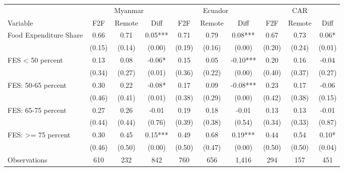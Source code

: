 \begin{tabular}{l*{9}c}
\hline\hline
 & \multicolumn{3}{c}{Myanmar} & \multicolumn{3}{c}{Ecuador} & \multicolumn{3}{c}{CAR}\\ 
Variable & F2F & Remote & Diff & F2F & Remote & Diff & F2F & Remote & Diff \\
\hline
Food Expenditure Share&0.66&0.71&0.05***&0.71&0.79&0.08***&0.67&0.73&0.06*\\
&(0.15)&(0.14)&(0.00)&(0.19)&(0.16)&(0.00)&(0.20)&(0.24)&(0.01)\\
FES < 50 percent&0.13&0.08&-0.06*&0.15&0.05&-0.10***&0.20&0.16&-0.04\\
&(0.34)&(0.27)&(0.01)&(0.36)&(0.22)&(0.00)&(0.40)&(0.37)&(0.27)\\
FES: 50-65 percent&0.30&0.22&-0.08*&0.17&0.09&-0.08***&0.23&0.17&-0.06\\
&(0.46)&(0.41)&(0.01)&(0.38)&(0.29)&(0.00)&(0.42)&(0.38)&(0.15)\\
FES: 65-75 percent&0.27&0.26&-0.01&0.19&0.18&-0.01&0.13&0.13&-0.01\\
&(0.44)&(0.44)&(0.76)&(0.39)&(0.38)&(0.54)&(0.34)&(0.33)&(0.87)\\
FES: >= 75 percent&0.30&0.45&0.15***&0.49&0.68&0.19***&0.44&0.54&0.10*\\
&(0.46)&(0.50)&(0.00)&(0.50)&(0.47)&(0.00)&(0.50)&(0.50)&(0.04)\\
\hline
Observations & 610 & 232 & 842 & 760 & 656 & 1,416 & 294 & 157 & 451 \\
\hline\hline
\end{tabular}
